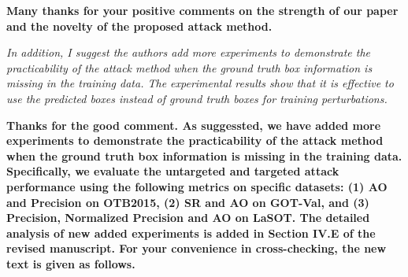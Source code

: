 \documentclass[12pt]{article}
\begin{document}
\textbf{Many thanks for your positive comments on the strength of our paper and the novelty of the proposed attack method.}

\textit{In addition, I suggest the authors add more experiments to demonstrate the practicability of the attack method when the ground truth box information is missing in the training data. The experimental results show that it is effective to use the predicted boxes instead of ground truth boxes for training perturbations.}

\textbf{Thanks for the good comment. As suggessted, we have added more experiments to demonstrate the practicability of the attack method when the ground truth box information is missing in the training data. Specifically, we evaluate the untargeted and targeted attack performance using the following metrics on specific datasets: (1) AO and Precision on OTB2015, (2) SR and AO on GOT-Val, and (3) Precision, Normalized Precision and AO on LaSOT. The detailed analysis of new added experiments is added in Section IV.E of the revised manuscript. For your convenience in cross-checking, the new text is given as follows.}
\end{document}

